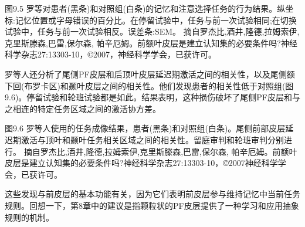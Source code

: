 \par
图9.5 罗等对患者(黑条)和对照组(白条)的记忆和注意选择任务的行为结果。纵坐标:记忆位置或字母错误的百分比。在停留试验中，任务与前一次试验相同;在切换试验中，任务与前一次试验相反。误差条:SEM。
摘自罗杰比,酒井,隆德,拉姆索伊,克里斯滕森,巴雷,保尔森, 帕辛厄姆。前额叶皮层是建立认知集的必要条件吗?神经科学杂志27:13303-10，©2007，神经科学学会，已获许可。
\par
罗等人还分析了尾侧PF皮层和后顶叶皮层延迟期激活之间的相关性，以及尾侧额下回(布罗卡区)和颞叶皮层之间的相关性。他们发现患者的相关性低于对照组(图9.6)。停留试验和轮班试验都是如此。结果表明，这种损伤破坏了尾侧PF皮层和与之相连的特定任务区域之间的激活协方差。
\par
图9.6 罗等人使用的任务成像结果，患者(黑条)和对照组(白条)。尾侧前部皮层延迟期激活与顶叶和颞叶任务相关区域之间的相关性。留庭审判和轮班审判分别进行。
摘自罗杰比,酒井,隆德,拉姆索伊,克里斯滕森,巴雷,保尔森, 帕辛厄姆。前额叶皮层是建立认知集的必要条件吗?神经科学杂志27:13303-10，©2007神经科学学会，已获许可。
\par
这些发现与前皮层的基本功能有关，因为它们表明前皮层参与维持记忆中当前任务规则。回想一下，第8章中的建议是指颗粒状的PF皮层提供了一种学习和应用抽象规则的机制。
